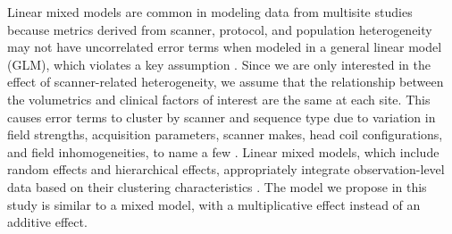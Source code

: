 Linear mixed models are common in modeling data from multisite studies because metrics derived from scanner, protocol, and population heterogeneity may not have uncorrelated error terms when modeled in a general linear model (GLM), which violates a key assumption \cite{garson2013fundamentals}. Since we are only interested in the effect of scanner-related heterogeneity, we assume that the relationship between the volumetrics and clinical factors of interest are the same at each site. This causes error terms to cluster by scanner and sequence type due to variation in field strengths, acquisition parameters, scanner makes, head coil configurations, and field inhomogeneities, to name a few \cite{cannon2014}. Linear mixed models, which include random effects and hierarchical effects, appropriately integrate observation-level data based on their clustering characteristics \cite{garson2013fundamentals}. The model we propose in this study is similar to a mixed model, with a multiplicative effect instead of an additive effect. 
